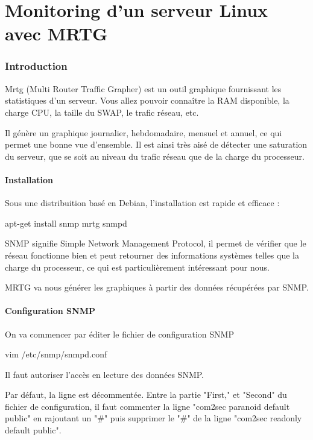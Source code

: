 \vfill \pagebreak
\part{Monitoring d'un serveur Linux avec MRTG}

\section{Introduction}

Mrtg (Multi Router Traffic Grapher) est un outil graphique fournissant les statistiques d'un serveur. Vous allez pouvoir connaître la RAM disponible, la charge CPU, la taille du SWAP, le trafic réseau, etc.

Il génère un graphique journalier, hebdomadaire, mensuel et annuel, ce qui permet une bonne vue d'ensemble. Il est ainsi très aisé de détecter une saturation du serveur, que se soit au niveau du trafic réseau que de la charge du processeur.

\subsection{Installation}

Sous une distribuition basé en Debian, l'installation est rapide et efficace :

apt-get install snmp mrtg snmpd

SNMP signifie Simple Network Management Protocol, il permet de vérifier que le réseau fonctionne bien et peut retourner des informations systèmes telles que la charge du processeur, ce qui est particulièrement intéressant pour nous.

MRTG va nous générer les graphiques à partir des données récupérées par SNMP.


\subsection{Configuration SNMP}

On va commencer par éditer le fichier de configuration SNMP

vim /etc/snmp/snmpd.conf


Il faut autoriser l'accès en lecture des données SNMP.

Par défaut, la ligne est décommentée. Entre la partie "First," et "Second" du fichier de configuration, il faut commenter la ligne "com2sec paranoid default public" en rajoutant un "#" puis supprimer le "#" de la ligne "com2sec readonly default public".

